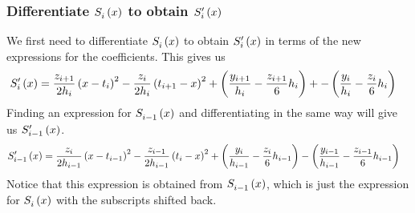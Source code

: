 \documentclass[letterpaper, 10pt, titlepage]{article}
\newcommand{\pp}{\paren}
\newcommand{\primed}[1]{^{
    \ifthenelse
    {
        \equal{#1}{0}
    }
    {
    }
    {
        \foreach \x in {1,...,#1}{\prime}}
    }
}
\newcommand{\fs}[3]{\functionof{S_{#1}\primed{#2}}{#3}}
\begin{document}
\subsubsection*{Differentiate $\fs{i}{0}{x}$ to obtain $\fs{i}{1}{x}$}
We first need to differentiate $\fs{i}{0}{x}$ to obtain $\fs{i}{1}{x}$ in terms
of the new expressions for the coefficients. This gives us
\begin{equation}
    \begin{aligned}
        \fs{i}{1}{x}
        &=
        \dfrac{z_{i+1}}{2h_i}\pp{x - t_i}^2
        - \dfrac{z_{i}}{2h_i}\pp{t_{i+1} - x}^2
        + \pp{
            \dfrac{y_{i+1}}{h_i}
            - \dfrac{z_{i+1}}{6}h_i
            }
        + -\pp{\dfrac{y_i}{h_i}
        - \dfrac{z_{i}}{6}h_i}
    \end{aligned}
\end{equation}
Finding an expression for $\fs{i - 1}{0}{x}$ and differentiating in the
same way will give us $\fs{i-1}{1}{x}$.
\begin{equation}
    \begin{aligned}
        \fs{i-1}{1}{x}
        &=
        \dfrac{z_{i}}{2h_{i-1}}\pp{x - t_{i - 1}}^2
        - \dfrac{z_{i-1}}{2h_{i-1}}\pp{t_{i} - x}^2
        + \pp{
            \dfrac{y_{i}}{h_{i-1}}
            - \dfrac{z_{i}}{6}h_{i-1}
            }
            - \pp{\dfrac{y_{i-1}}{h_{i-1}}
            - \dfrac{z_{i-1}}{6}h_{i-1}}
    \end{aligned}
\end{equation}
Notice that this expression is obtained from $\fs{i - 1}{0}{x}$, which is just
the expression for $\fs{i}{0}{x}$ with the subscripts shifted back.
\end{document}
